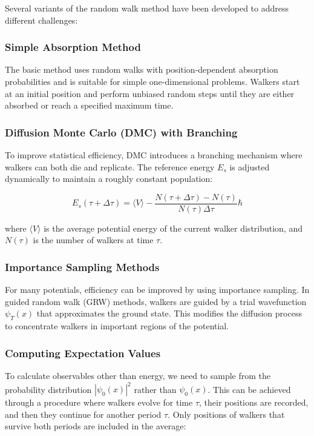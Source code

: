 \documentclass[reqno]{amsart}
\numberwithin{equation}{section}
\numberwithin{figure}{section}
\begin{document}
Several variants of the random walk method have been developed to address different challenges:

\subsubsection{Simple Absorption Method}

The basic method uses random walks with position-dependent absorption probabilities and is suitable for simple one-dimensional problems. Walkers start at an initial position and perform unbiased random steps until they are either absorbed or reach a specified maximum time.

\subsubsection{Diffusion Monte Carlo (DMC) with Branching}

To improve statistical efficiency, DMC introduces a branching mechanism where walkers can both die and replicate. The reference energy $E_s$ is adjusted dynamically to maintain a roughly constant population:

\begin{equation}
E_s(\tau+\Delta\tau) = \langle V \rangle - \frac{N(\tau+\Delta\tau) - N(\tau)}{N(\tau)\Delta\tau}\hbar
\end{equation}

where $\langle V \rangle$ is the average potential energy of the current walker distribution, and $N(\tau)$ is the number of walkers at time $\tau$.

\subsubsection{Importance Sampling Methods}

For many potentials, efficiency can be improved by using importance sampling. In guided random walk (GRW) methods, walkers are guided by a trial wavefunction $\psi_T(x)$ that approximates the ground state. This modifies the diffusion process to concentrate walkers in important regions of the potential.

\subsubsection{Computing Expectation Values}

To calculate observables other than energy, we need to sample from the probability distribution $|\psi_0(x)|^2$ rather than $\psi_0(x)$. This can be achieved through a procedure where walkers evolve for time $\tau$, their positions are recorded, and then they continue for another period $\tau$. Only positions of walkers that survive both periods are included in the average:
\end{document}
